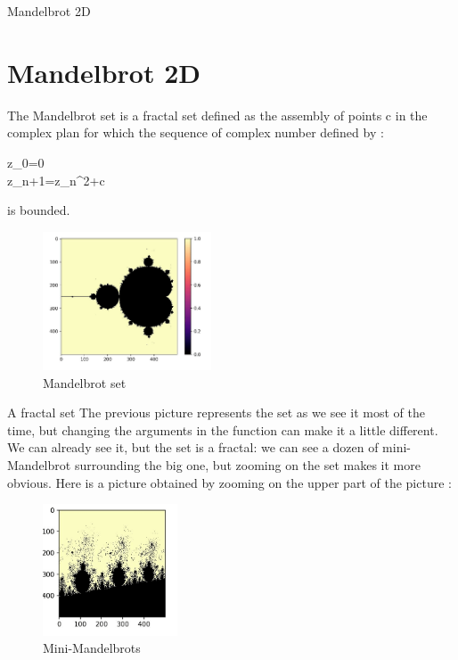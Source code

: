 \documentclass [xcolor=svgnames, t] {beamer}
\begin{document}
\begin{frame}{Mandelbrot 2D}
\section{Mandelbrot 2D}
  The Mandelbrot set is a fractal set defined as the assembly of points c in the complex plan for which the sequence of complex number defined by :
	\begin{center}
	\begin{cases}
	z_0=0\\
	z_{n+1}=z_n^2+c
	\end{cases}
    \end{center}
	is bounded.  
	\begin{figure}[!h]
    \begin{center}
   \caption{\label{étiquette} Mandelbrot set}
   \includegraphics[width=5cm]{Mandelbrotset.png}
   \end{center}
    \end{figure}
\end{frame}

\begin{frame}{A fractal set}
	The previous picture represents the set as we see it most of the time, but changing the arguments in the function can make it a little different. We can already see it, but the set is a fractal: we can see a dozen of mini-Mandelbrot surrounding the big one, but zooming on the set makes it more obvious. Here is a picture obtained by zooming on the upper part of the picture :
    \begin{figure}[!h]
    \begin{center}
   \caption{\label{étiquette} Mini-Mandelbrots}
   \includegraphics[width=4cm]{Mandelbrot_zoom.png}
   \end{center}
    \end{figure}
\end{frame}
\end{document}
